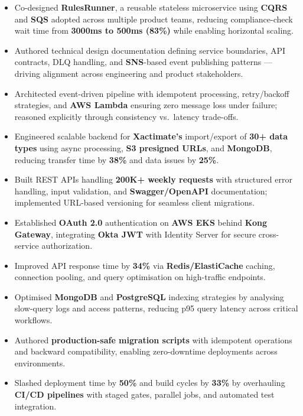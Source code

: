 \documentclass[letterpaper,10pt]{article}
\begin{document}
\begin{itemize}[leftmargin=*]
    \item Co-designed \textbf{RulesRunner}, a reusable stateless microservice using \textbf{CQRS} and \textbf{SQS} adopted across multiple product teams, reducing compliance-check wait time from \textbf{3000ms to 500ms (83\%)} while enabling horizontal scaling.
    \item Authored technical design documentation defining service boundaries, API contracts, DLQ handling, and \textbf{SNS}-based event publishing patterns — driving alignment across engineering and product stakeholders.
    \item Architected event-driven pipeline with idempotent processing, retry/backoff strategies, and \textbf{AWS Lambda} ensuring zero message loss under failure; reasoned explicitly through consistency vs.\ latency trade-offs.
    \item Engineered scalable backend for \textbf{Xactimate's} import/export of \textbf{30+ data types} using async processing, \textbf{S3 presigned URLs}, and \textbf{MongoDB}, reducing transfer time by \textbf{38\%} and data issues by \textbf{25\%}.
    \item Built REST APIs handling \textbf{200K+ weekly requests} with structured error handling, input validation, and \textbf{Swagger/OpenAPI} documentation; implemented URL-based versioning for seamless client migrations.
    \item Established \textbf{OAuth 2.0} authentication on \textbf{AWS EKS} behind \textbf{Kong Gateway}, integrating \textbf{Okta JWT} with Identity Server for secure cross-service authorization.
    \item Improved API response time by \textbf{34\%} via \textbf{Redis/ElastiCache} caching, connection pooling, and query optimisation on high-traffic endpoints.
    \item Optimised \textbf{MongoDB} and \textbf{PostgreSQL} indexing strategies by analysing slow-query logs and access patterns, reducing p95 query latency across critical workflows.
    \item Authored \textbf{production-safe migration scripts} with idempotent operations and backward compatibility, enabling zero-downtime deployments across environments.
    \item Slashed deployment time by \textbf{50\%} and build cycles by \textbf{33\%} by overhauling \textbf{CI/CD pipelines} with staged gates, parallel jobs, and automated test integration.
\end{itemize}
\end{document}
